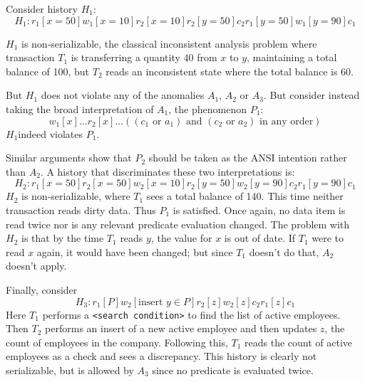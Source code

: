 \documentclass[11pt]{article}
\begin{document}
Consider history \(H_1\):
\begin{equation*}
H_1:r_1[x=50]w_1[x=10]r_2[x=10]r_2[y=50]c_2r_1[y=50]w_1[y=90]c_1
\end{equation*}

\(H_1\) is non-serializable, the classical inconsistent analysis problem where transaction \(T_1\) is
transferring a quantity 40 from \(x\) to \(y\), maintaining a total balance of 100, but \(T_2\) reads
an inconsistent state where the total balance is 60.

But \(H_1\) does not violate any of the anomalies \(A_1\), \(A_2\) or \(A_3\). But consider instead
taking the broad interpretation of \(A_1\), the phenomenon \(P_1\):
\begin{equation*}
w_1[x]\dots r_2[x]\dots((c_1\text{ or }a_1)\text{ and }(c_2\text{ or }a_2)\text{ in any order})
\end{equation*}
\(H_1\)indeed violates \(P_1\).

Similar arguments show that \(P_2\) should be taken as the ANSI intention rather than \(A_2\). A
history that discriminates these two interpretations is:
\begin{equation*}
H_2:r_1[x=50]r_2[x=50]w_2[x=10]r_2[y=50]w_2[y=90]c_2r_1[y=90]c_1
\end{equation*}
\(H_2\) is non-serializable, where \(T_1\) sees a total balance of 140. This time neither transaction
reads dirty data. Thus \(P_1\) is satisfied. Once again, no data item is read twice nor is any
relevant predicate evaluation changed. The problem with \(H_2\) is that by the time \(T_1\) reads
\(y\), the value for \(x\) is out of date. If \(T_1\) were to read \(x\) again, it would have been
changed; but since \(T_1\) doesn't do that, \(A_2\) doesn't apply.


Finally, consider
\begin{equation*}
H_3:r_1[P]w_2[\text{insert }y\in  P]r_2[z]w_2[z]c_2r_1[z]c_1
\end{equation*}
Here \(T_1\) performs a \texttt{<search condition>} to find the list of active employees. Then \(T_2\) performs an
insert of a new active employee and then updates \(z\), the count of employees in the company.
Following this, \(T_1\) reads the count of active employees as a check and sees a discrepancy. This
history is clearly not serializable, but is allowed by \(A_3\) since no predicate is evaluated twice.
\end{document}
